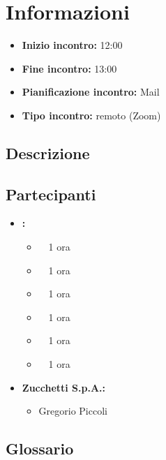 \section{Informazioni}
\begin{itemize}
	\item \textbf{Inizio incontro:} 12:00
	\item \textbf{Fine incontro:} 13:00
	\item \textbf{Pianificazione incontro:} Mail
	\item \textbf{Tipo incontro:} remoto (Zoom)
\end{itemize}

\subsection{Descrizione}
\DocDescription

\subsection{Partecipanti}

\begin{itemize}
	\item \textbf{\GroupName:}
	\begin{itemize}
		\item \tommaso \ \rightarrow\ 1 ora
		\item \marco \ \rightarrow\ 1 ora
		\item \riccardo \ \rightarrow\ 1 ora
		\item \raul \ \rightarrow\ 1 ora 
		\item \martina \ \rightarrow\ 1 ora 
		\item \sebastiano \ \rightarrow\ 1 ora
	\end{itemize}
	\item \textbf{Zucchetti S.p.A.:}
    \begin{itemize}
        \item Gregorio Piccoli
    \end{itemize}
\end{itemize}

\subsection{Glossario}
\GlossarioIntroduzione

\clearpage